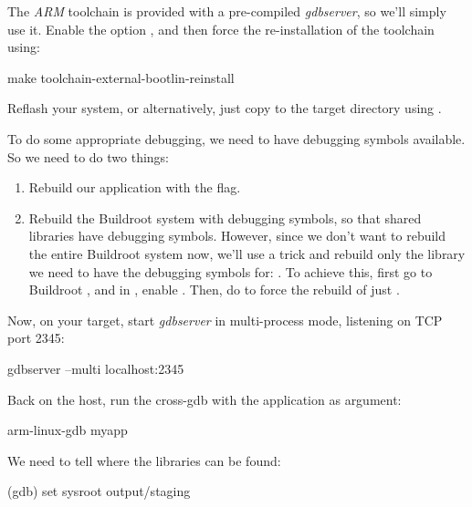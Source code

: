 The {\em ARM} toolchain is provided with a pre-compiled {\em
  gdbserver}, so we'll simply use it. Enable the option
, and then force the
re-installation of the toolchain using:

\begin{bashinput}
make toolchain-external-bootlin-reinstall
\end{bashinput}

Reflash your system, or alternatively, just copy
 to the target 
directory using .

To do some appropriate debugging, we need to have debugging symbols
available. So we need to do two things:

\begin{enumerate}

\item Rebuild our application with the  flag.

\item Rebuild the Buildroot system with debugging symbols, so that
  shared libraries have debugging symbols. However, since we don't
  want to rebuild the entire Buildroot system now, we'll use a trick
  and rebuild only the library we need to have the debugging symbols
  for: . To achieve this, first go to Buildroot
  , and in , enable
  . Then, do  to force the rebuild of just
  .

\end{enumerate}

Now, on your target, start {\em gdbserver} in multi-process mode,
listening on TCP port 2345:

\begin{bashinput}
gdbserver --multi localhost:2345
\end{bashinput}

Back on the host, run the cross-gdb with the  application
as argument:

\begin{bashinput}
arm-linux-gdb myapp
\end{bashinput}

We need to tell  where the libraries can be found:

\begin{bashinput}
(gdb) set sysroot output/staging
\end{bashinput}

